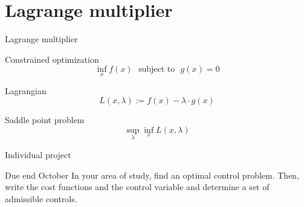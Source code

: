 \documentclass[color=usenames,dvipsnames]{beamer}
\begin{document}
\section{Lagrange multiplier}
\begin{frame}{Lagrange multiplier}
    \begin{block}
        {Constrained optimization}
        \[
        \inf_x f(x) ~~~ \textrm{subject to}~~~g(x)=0
        \]
    \end{block}
    \begin{block}
        {Lagrangian}
        \[
        L(x,\lambda):= f(x) - \lambda \cdot g(x)
        \]
    \end{block}
    \begin{block}
        {Saddle point problem}
        \[
        \sup_{\lambda}\inf_{x}L(x,\lambda)
        \]
    \end{block}
\end{frame}

\begin{frame}{Individual project}
\begin{block}{Due end October}
     In your area of study, find an optimal control problem. Then, write the cost functions and the control variable and determine a set of admissible controls. 
\end{block}
\end{frame}
\end{document}

